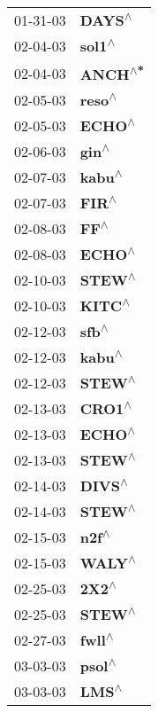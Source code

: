 \begin{supertabular}{p{0.08\textwidth}p{0.2\textwidth}}
 01-31-03 &    \textbf{DAYS\textsuperscript{$\wedge$}} \\
 02-04-03 &    \textbf{sol1\textsuperscript{$\wedge$}} \\
 02-04-03 &   \textbf{ANCH\textsuperscript{$\wedge$*}} \\
 02-05-03 &    \textbf{reso\textsuperscript{$\wedge$}} \\
 02-05-03 &    \textbf{ECHO\textsuperscript{$\wedge$}} \\
 02-06-03 &     \textbf{gin\textsuperscript{$\wedge$}} \\
 02-07-03 &    \textbf{kabu\textsuperscript{$\wedge$}} \\
 02-07-03 &     \textbf{FIR\textsuperscript{$\wedge$}} \\
 02-08-03 &      \textbf{FF\textsuperscript{$\wedge$}} \\
 02-08-03 &    \textbf{ECHO\textsuperscript{$\wedge$}} \\
 02-10-03 &    \textbf{STEW\textsuperscript{$\wedge$}} \\
 02-10-03 &    \textbf{KITC\textsuperscript{$\wedge$}} \\
 02-12-03 &     \textbf{sfb\textsuperscript{$\wedge$}} \\
 02-12-03 &    \textbf{kabu\textsuperscript{$\wedge$}} \\
 02-12-03 &    \textbf{STEW\textsuperscript{$\wedge$}} \\
 02-13-03 &    \textbf{CRO1\textsuperscript{$\wedge$}} \\
 02-13-03 &    \textbf{ECHO\textsuperscript{$\wedge$}} \\
 02-13-03 &    \textbf{STEW\textsuperscript{$\wedge$}} \\
 02-14-03 &    \textbf{DIVS\textsuperscript{$\wedge$}} \\
 02-14-03 &    \textbf{STEW\textsuperscript{$\wedge$}} \\
 02-15-03 &     \textbf{n2f\textsuperscript{$\wedge$}} \\
 02-15-03 &    \textbf{WALY\textsuperscript{$\wedge$}} \\
 02-25-03 &     \textbf{2X2\textsuperscript{$\wedge$}} \\
 02-25-03 &    \textbf{STEW\textsuperscript{$\wedge$}} \\
 02-27-03 &    \textbf{fwll\textsuperscript{$\wedge$}} \\
 03-03-03 &    \textbf{psol\textsuperscript{$\wedge$}} \\
 03-03-03 &     \textbf{LMS\textsuperscript{$\wedge$}} \\

\end{supertabular}
